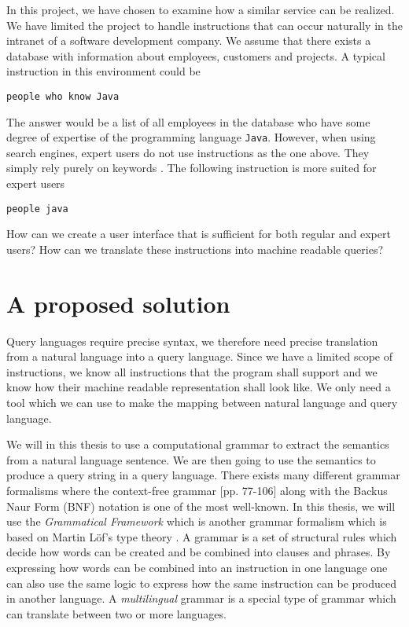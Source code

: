 In this project, we have chosen to examine how a similar service can be realized. We have limited the project to handle instructions that can occur naturally in the intranet of a software development company. We assume that there exists a database with information about employees, customers and projects. A typical instruction in this environment could be

\begin{verbatim}
people who know Java
\end{verbatim}

The answer would be a list of all employees in the database who have some degree of expertise of the programming language \texttt{Java}. However, when using search engines, expert users do not use instructions as the one above. They simply rely purely on keywords \cite{mayer:2007}. The following instruction is more suited for expert users

\begin{verbatim}
people java
\end{verbatim}

How can we create a user interface that is sufficient for both regular and expert users? How can we translate these instructions into machine readable queries?

\section{A proposed solution}
Query languages require precise syntax, we therefore need precise translation from a natural language into a query language. Since we have a limited scope of instructions, we know all instructions that the program shall support and we know how their machine readable representation shall look like. We only need a tool which we can use to make the mapping between natural language and query language. 

We will in this thesis to use a computational grammar to extract the semantics from a natural language sentence. We are then going to use the semantics to produce a query string in a query language.
\newline
\newline
There exists many different grammar formalisms where the context-free grammar \cite{Hopcroft:1990:IAT:574901}[pp. 77-106] along with the Backus Naur Form (BNF) notation \cite{DBLP:journals/cacm/Backus78} is one of the most well-known. In this thesis, we will use the \emph{Grammatical Framework} which is another grammar formalism \cite{ranta:2004} which is based on Martin Löf's type theory \cite{Martin-Löf_anintuitionistic}.
\newline
\newline
A grammar is a set of structural rules which decide how words can be created and be combined into clauses and phrases. By expressing how words can be combined into an instruction in one language one can also use the same logic to express how the same instruction can be produced in another language. A \emph{multilingual} grammar is a special type of grammar which can translate between two or more languages.

